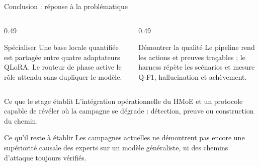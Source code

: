 \documentclass[aspectratio=169,10pt]{beamer}
\begin{document}
\begin{frame}{Conclusion : réponse à la problématique}
  \begin{columns}[T,onlytextwidth]
    \begin{column}{0.49\textwidth}
      \begin{exampleblock}{Spécialiser}
        Une base locale quantifiée est partagée entre quatre adaptateurs QLoRA.
        Le routeur de phase active le rôle attendu sans dupliquer le modèle.
      \end{exampleblock}
    \end{column}
    \begin{column}{0.49\textwidth}
      \begin{exampleblock}{Démontrer la qualité}
        Le pipeline rend les actions et preuves traçables ; le harness répète les
        scénarios et mesure Q-F1, hallucination et achèvement.
      \end{exampleblock}
    \end{column}
  \end{columns}

  \vspace{0.8em}
  \begin{block}{Ce que le stage établit}
    L'intégration opérationnelle du HMoE et un protocole capable de révéler où
    la campagne se dégrade : détection, preuve ou construction du chemin.
  \end{block}

  \begin{alertblock}{Ce qu'il reste à établir}
    Les campagnes actuelles ne démontrent pas encore une supériorité causale des
    experts sur un modèle généraliste, ni des chemins d'attaque toujours vérifiés.
  \end{alertblock}
\end{frame}
\end{document}
